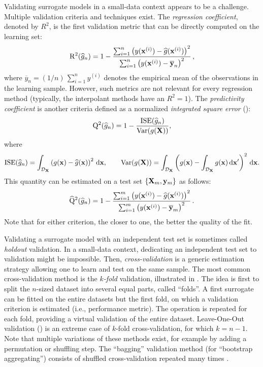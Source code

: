 Validating surrogate models in a small-data context appears to be a challenge. 
Multiple validation criteria and techniques exist. 
The \textit{regression coefficient}, denoted by $R^2$, is the first validation metric that can be directly computed on the learning set:
\begin{equation}
    \mathrm{R}^2(\widehat{g}_n) = 1 - \frac{ \sum_{i=1}^n  \left(y({\bf x}^{(i)}) - \widehat{g}({\bf x}^{(i)})\right)^2}{\sum_{i=1}^n \left(y({\bf x}^{(i)})-\overline{{\bf y}}_n\right)^2}\,,
\end{equation}
where $\overline{y}_n=(1/n)\,\sum_{i=1}^n y^{(i)}$ denotes the empirical mean of the observations in the learning sample. 
However, such metrics are not relevant for every regression method (typically, the interpolant methods have an $R^2=1$). 
The \textit{predictivity coefficient} \citep{NashS70} is another criteria defined as a normalized \textit{integrated square error} (): 
\begin{equation}
    \mathrm{Q}^2(\widehat{g}_n) = 1 - \frac{\mathrm{ISE}(\widehat{g}_n)}{\operatorname{Var}(g({\bf X}))}, 
\end{equation} 
where 
\begin{equation}
    \mathrm{ISE}(\widehat{g}_n) = \int_{\mathcal{D}_{{\bf X}}} \left(g({\bf x}) - \widehat{g}({\bf x})\right)^2 \, \mathrm{d}{\bf x}, \qquad
    \operatorname{Var}(g({\bf X})) = \int_{\mathcal{D}_{{\bf X}}} \left(g({\bf x}) - \int_{\mathcal{D}_{{\bf X}}} g({\bf x})\, \mathrm{d}{\bf x}' \right)^2 \, \mathrm{d}{\bf x}.
\end{equation}
This quantity can be estimated on a test set $\left\{{\bf X}_m, {\bf y}_m\right\}$ as follows: 
\begin{equation}
    \widehat{\mathrm{Q}}^2(\widehat{g}_n) = 1 - \frac{ \sum_{i=1}^m  \left(y({\bf x}^{(i)}) - \widehat{g}({\bf x}^{(i)})\right)^2}{\sum_{i=1}^m \left(y({\bf x}^{(i)}) - \overline{{\bf y}}_m\right)^2}\,.
\end{equation}
Note that for either criterion, the closer to one, the better the quality of the fit. 

Validating a surrogate model with an independent test set is sometimes called \textit{holdout} validation.
In a small-data context, dedicating an independent test set to validation might be impossible.
Then, \textit{cross-validation} is a generic estimation strategy allowing one to learn and test on the same sample. 
The most common cross-validation method is the \textit{$k$-fold} validation, illustrated in . 
The idea is first to split the $n$-sized dataset into several equal parts, called ``folds''. 
A first surrogate can be fitted on the entire datasets but the first fold, on which a validation criterion is estimated (i.e., performance metric). 
The operation is repeated for each fold, providing a virtual validation of the entire dataset. 
Leave-One-Out validation () is an extreme case of $k$-fold cross-validation, for which $k=n-1$. 
Note that multiple variations of these methods exist, for example by adding a permutation or shuffling step. 
The ``bagging'' validation method (for ``bootstrap aggregating'') consists of shuffled cross-validation repeated many times \citep{breiman_1996_bagging}. 

